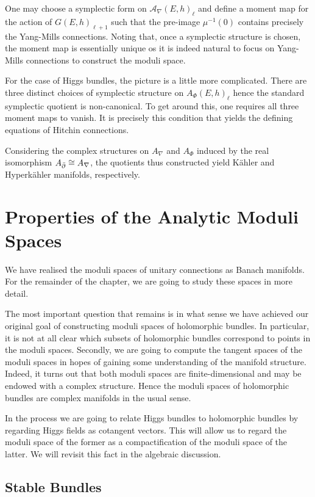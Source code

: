 \documentclass[12pt]{ociamthesis}  %
\begin{document}
One may choose a symplectic form on $\mathcal A_\nabla(E,h)_\ell$ and
define a moment map for the action of $G(E,h)_{\ell+1}$ such that the
pre-image $\mu^{-1}(0)$ contains precisely the Yang-Mills connections.
Noting that, once a symplectic structure is chosen, the moment map
is essentially unique os it is indeed natural to focus on Yang-Mills
connections to construct the moduli space.

For the case of Higgs bundles, the picture is a little more complicated.
There are three distinct choices of symplectic structure on
$A_\Phi(E,h)_\ell$ hence the standard symplectic quotient is non-canonical.
To get around this, one requires all three moment maps to vanish. It is
precisely this condition that yields the defining equations of
Hitchin connections.

Considering the complex structures on $A_\nabla$ and $A_\Phi$ induced
by the real isomorphism $A_{\bar{\partial}}\cong A_\nabla$, the quotients
thus constructed yield K\"ahler and Hyperk\"ahler manifolds, respectively.

\section{Properties of the Analytic Moduli Spaces}

We have realised the moduli spaces of unitary connections as
Banach manifolds. For the remainder of the chapter, we are going to
study these spaces in more detail.

The most important question that remains is in what sense we have
achieved our original goal of constructing moduli spaces of
holomorphic bundles. In particular, it is not at all clear which subsets
of holomorphic bundles correspond to points in the moduli spaces.
Secondly, we are going to compute the tangent spaces of the moduli
spaces in hopes of gaining some understanding of the manifold structure.
Indeed, it turns out that both moduli spaces are finite-dimensional
and may be endowed with a complex structure. Hence the moduli spaces
of holomorphic bundles are complex manifolds in the usual sense.

In the process we are going to relate Higgs bundles to holomorphic bundles
by regarding Higgs fields as cotangent vectors. This will allow us to
regard the moduli space of the former as a compactification of the moduli
space of the latter. We will revisit this fact in the algebraic discussion.

\subsection{Stable Bundles}
\end{document}
